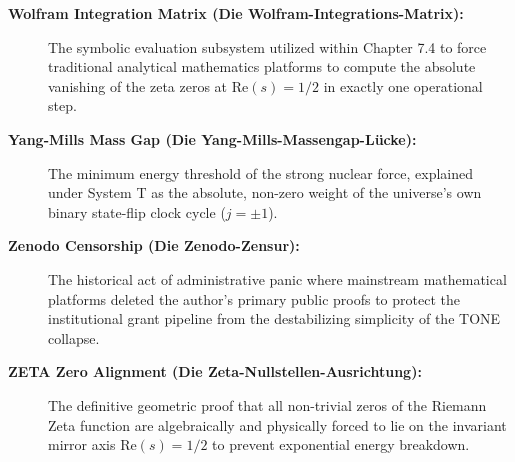 \documentclass[11pt,a4paper]{article}
\begin{document}
\begin{description}
\item[\textbf{Wolfram Integration Matrix (Die Wolfram-Integrations-Matrix):}] The symbolic evaluation subsystem utilized within Chapter 7.4 to force traditional analytical mathematics platforms to compute the absolute vanishing of the zeta zeros at $\text{Re}(s) = 1/2$ in exactly one operational step.
\item[\textbf{Yang-Mills Mass Gap (Die Yang-Mills-Massengap-Lücke):}] The minimum energy threshold of the strong nuclear force, explained under System T as the absolute, non-zero weight of the universe's own binary state-flip clock cycle ($j = \pm 1$).
\item[\textbf{Zenodo Censorship (Die Zenodo-Zensur):}] The historical act of administrative panic where mainstream mathematical platforms deleted the author's primary public proofs to protect the institutional grant pipeline from the destabilizing simplicity of the TONE collapse.
\item[\textbf{ZETA Zero Alignment (Die Zeta-Nullstellen-Ausrichtung):}] The definitive geometric proof that all non-trivial zeros of the Riemann Zeta function are algebraically and physically forced to lie on the invariant mirror axis $\text{Re}(s) = 1/2$ to prevent exponential energy breakdown.
\end{description}
\end{document}
